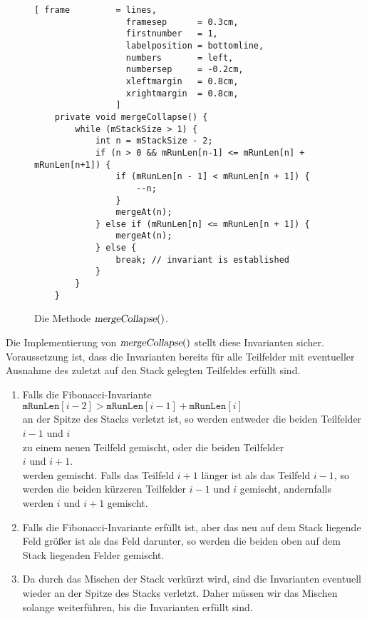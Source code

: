 \begin{figure}[!ht]
\centering
\begin{Verbatim}[ frame         = lines, 
                  framesep      = 0.3cm, 
                  firstnumber   = 1,
                  labelposition = bottomline,
                  numbers       = left,
                  numbersep     = -0.2cm,
                  xleftmargin   = 0.8cm,
                  xrightmargin  = 0.8cm,
                ]
    private void mergeCollapse() {
        while (mStackSize > 1) {
            int n = mStackSize - 2;
            if (n > 0 && mRunLen[n-1] <= mRunLen[n] + mRunLen[n+1]) {
                if (mRunLen[n - 1] < mRunLen[n + 1]) {
                    --n;
                }
                mergeAt(n);
            } else if (mRunLen[n] <= mRunLen[n + 1]) {
                mergeAt(n);
            } else {
                break; // invariant is established
            }
        }
    }
\end{Verbatim}
\vspace*{-0.3cm}
\caption{Die Methode $\textsl{mergeCollapse}()$.}
\label{fig:TimSort.java:mergeCollapse}
\end{figure}

Die Implementierung von $\textsl{mergeCollapse}()$ stellt diese Invarianten sicher.  Voraussetzung
ist, dass die Invarianten bereits f\"ur alle Teilfelder mit eventueller Ausnahme des zuletzt auf den
Stack gelegten Teilfeldes erf\"ullt sind.  
\begin{enumerate}
\item Falls die Fibonacci-Invariante
      \\[0.2cm]
      \hspace*{1.3cm}
      $\mathtt{mRunLen}[i-2] > \mathtt{mRunLen}[i-1] + \mathtt{mRunLen}[i]$
      \\[0.2cm]
      an der Spitze des Stacks verletzt ist, so werden entweder die beiden Teilfelder
      \\[0.2cm]
      \hspace*{1.3cm}
      $i-1$ und $i$
      \\[0.2cm]
      zu einem neuen Teilfeld gemischt, oder die beiden Teilfelder
      \\[0.2cm]
      \hspace*{1.3cm}
      $i$ und $i+1$.
      \\[0.2cm]
      werden gemischt. Falls das Teilfeld $i+1$ l\"anger ist als das Teilfeld $i-1$, so werden die 
      beiden k\"urzeren Teilfelder $i-1$ und $i$ gemischt, andernfalls werden $i$ und $i+1$ gemischt.
\item Falls die Fibonacci-Invariante erf\"ullt ist, aber das neu auf dem Stack liegende Feld gr\"o{\ss}er
      ist als das Feld darunter, so werden die beiden oben auf dem Stack liegenden Felder gemischt.
\item Da durch das Mischen der Stack verk\"urzt wird, sind die Invarianten eventuell wieder an der
      Spitze des Stacks verletzt.  Daher  m\"ussen wir das Mischen solange weiterf\"uhren, bis
      die Invarianten erf\"ullt sind.
\end{enumerate}

